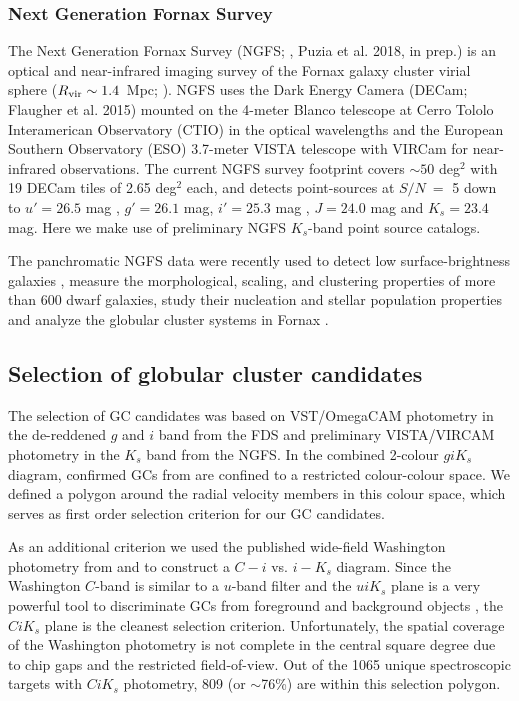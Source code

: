 \documentclass[usenatbib]{mnras}
\begin{document}
\subsubsection{Next Generation Fornax Survey}
\label{sec:NGFS}
The Next Generation Fornax Survey (NGFS; \citealt{munoz15}, Puzia et al. 2018, in prep.)
is an optical and near-infrared imaging survey of the Fornax
galaxy cluster virial sphere ($R_{\rm vir}\sim 1.4$~Mpc; \citealt{Drinkwater+01}).
NGFS uses the Dark Energy Camera (DECam; Flaugher et al. 2015) mounted on the
4-meter Blanco telescope at Cerro Tololo Interamerican Observatory (CTIO) in the
optical wavelengths and the European Southern Observatory (ESO) 3.7-meter VISTA
telescope with VIRCam \citep{sutherland15} for near-infrared observations.
The current NGFS survey footprint covers $\sim50$ deg$^2$ with 19 DECam tiles of 2.65
deg$^2$ each, and detects point-sources at $S/N\ =$ 5 down to $u'= 26.5$ mag , $g'= 26.1$ mag,
$i'= 25.3$ mag , $J = 24.0$ mag and $K_s = 23.4$ mag. Here we make use of preliminary NGFS
$K_s$-band point source catalogs.

The panchromatic NGFS data were recently used to detect low surface-brightness
galaxies \citep{munoz15}, measure the morphological, scaling, and clustering
properties of more than 600 dwarf galaxies, study their nucleation and stellar population properties and analyze the globular cluster systems in Fornax \citep{Eigenthaler18, Ordenes-Briceno18}.

\subsection{Selection of globular cluster candidates}
\label{sec:selectionGC}
The selection of GC candidates was based on VST/OmegaCAM photometry in the de-reddened $g$
and $i$ band from the FDS \citep{DAbrusco16,Iodice16} and preliminary
VISTA/VIRCAM photometry in the $K_s$ band from the NGFS.
In the combined 2-colour $g i K_s$ diagram, confirmed GCs from \citet{Schuberth}
are confined to a restricted colour-colour space. We defined a polygon around
the radial velocity members in this colour space, which serves as first order
selection criterion for our GC candidates.

As an additional criterion we used the published wide-field Washington
photometry from \citet{Dirsch04} and \citet{Bassino} to construct a $C-i$ vs.
$i-K_s$ diagram. Since the Washington $C$-band is similar to a $u$-band filter
and the $uiK_s$ plane is a very powerful tool to discriminate GCs from
foreground and background objects \citep{Munoz14}, the $CiK_s$ plane is the
cleanest selection criterion. Unfortunately, the spatial coverage of the
Washington photometry is not complete in the central square degree due to chip
gaps and the restricted field-of-view. Out of the 1065 unique spectroscopic
targets with $CiK_s$ photometry, 809 (or $\sim$76\%) are within this selection
polygon.
\end{document}
